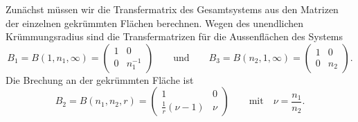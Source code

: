 \begin{loesung}
Zunächst müssen wir die Transfermatrix des Gesamtsystems aus den Matrizen
der einzelnen gekrümmten Flächen berechnen.
Wegen des unendlichen Krümmungsradius sind die Transfermatrizen für 
die Aussenflächen des Systems
\[
B_1=B(1,n_1,\infty) = \begin{pmatrix} 1&0\\0&n_1^{-1}\end{pmatrix}
\qquad\text{und}\qquad
B_3=B(n_2,1,\infty) = \begin{pmatrix} 1&0\\0&n_2\end{pmatrix}.
\]
Die Brechung an der gekrümmten Fläche ist
\[
B_2 = B(n_1,n_2,r)
=
\begin{pmatrix}
1&0\\
\frac1r(\nu -1) & \nu
\end{pmatrix}
\qquad
\text{mit}\quad
\nu = \frac{n_1}{n_2}.
\]



\end{loesung}
